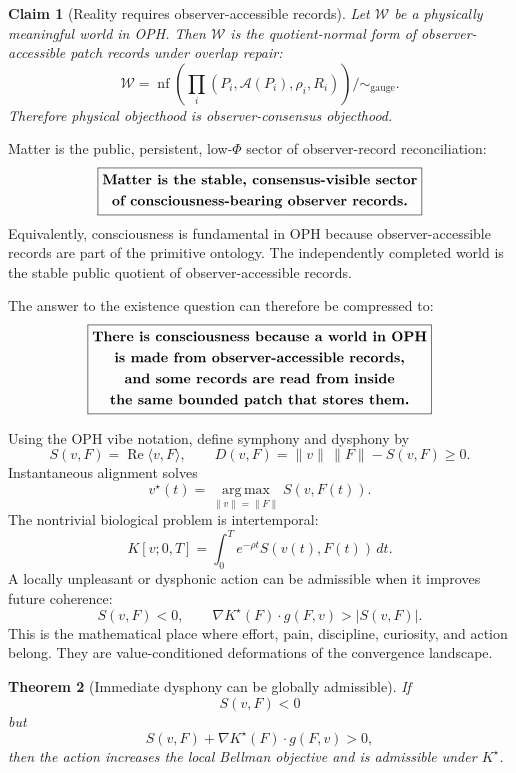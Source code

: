 \documentclass[11pt]{article}
\newtheorem{theorem}{Theorem}[section]
\newtheorem{claim}[theorem]{Claim}
\theoremstyle{remark}
\theoremstyle{plain}
\newcommand{\argmax}{\operatorname*{arg\,max}}
\begin{document}
\begin{claim}[Reality requires observer-accessible records]
Let \(\mathcal W\) be a physically meaningful world in OPH. Then \(\mathcal W\) is the quotient-normal form of observer-accessible patch records under overlap repair:
\[
\mathcal W
=
\operatorname{nf}\!\left(
\prod_i (P_i,\mathcal A(P_i),\rho_i,R_i)
\right)\big/\!\sim_{\mathrm{gauge}}.
\]
Therefore physical objecthood is observer-consensus objecthood.
\end{claim}

Matter is the public, persistent, low-\(\Phi\) sector of observer-record reconciliation:
\[
\boxed{
\begin{gathered}
\text{\bfseries Matter is the stable, consensus-visible sector}\\
\text{\bfseries of consciousness-bearing observer records.}
\end{gathered}
}
\]
Equivalently, consciousness is fundamental in OPH because observer-accessible records are part of the primitive ontology. The independently completed world is the stable public quotient of observer-accessible records.

The answer to the existence question can therefore be compressed to:
\[
\boxed{
\begin{gathered}
\text{\bfseries There is consciousness because a world in OPH}\\
\text{\bfseries is made from observer-accessible records,}\\
\text{\bfseries and some records are read from inside}\\
\text{\bfseries the same bounded patch that stores them.}
\end{gathered}
}
\]

Using the OPH vibe notation, define symphony and dysphony by
\[
S(v,F)=\operatorname{Re}\langle v,F\rangle,
\qquad
D(v,F)=\|v\|\,\|F\|-S(v,F)\ge 0.
\]
Instantaneous alignment solves
\[
v^\star(t)=\argmax_{\|v\|=\|F\|}S(v,F(t)).
\]
The nontrivial biological problem is intertemporal:
\[
K[v;0,T]
=
\int_0^T e^{-\rho t}S(v(t),F(t))\,dt.
\]
A locally unpleasant or dysphonic action can be admissible when it improves future coherence:
\[
S(v,F)<0,
\qquad
\nabla K^\star(F)\cdot g(F,v)>|S(v,F)|.
\]
This is the mathematical place where effort, pain, discipline, curiosity, and action belong. They are value-conditioned deformations of the convergence landscape.

\begin{theorem}[Immediate dysphony can be globally admissible]
If
\[
S(v,F)<0
\]
but
\[
S(v,F)+\nabla K^\star(F)\cdot g(F,v)>0,
\]
then the action increases the local Bellman objective and is admissible under \(K^\star\).
\end{theorem}
\end{document}
